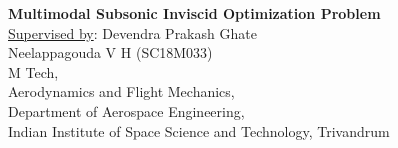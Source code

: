 \begin{titlepage}
    \begin{center}
        \vspace*{1cm}
        \Huge
        \textbf{Multimodal Subsonic Inviscid Optimization Problem}\\
        
        \LARGE
       \vspace{0.5cm}
        \underline{Supervised by}: Devendra Prakash Ghate\\[2mm]
        Neelappagouda V H (SC18M033)\\
        \Large
        \vspace{0.5cm} 
        M Tech,\\
        Aerodynamics and Flight Mechanics,\\ Department of Aerospace Engineering,\\
        Indian Institute of Space Science and Technology, Trivandrum
      
    \end{center}
     
\end{titlepage}
